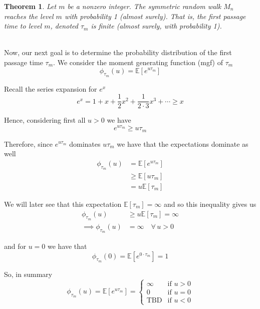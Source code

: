\documentclass[12pt]{article}
\newtheorem{theorem}{Theorem}
\newlength\tindent
\renewcommand{\indent}{\hspace*{\tindent}}
\newcommand{\E}{\mathbb E}
\begin{document}
\begin{theorem} Let $m$ be a nonzero integer. The symmetric random walk $M_n$ reaches the level $m$ with probability 1 (almost surely). That is, the first passage time to level $m$, denoted $\tau_m$ is finite (almost surely, with probability 1).
\end{theorem} \hfill\\%

\indent Now, our next goal is to determine the probability distribution of the first passage time $\tau_m$. We consider the moment generating function (mgf) of $\tau_m$
\begin{equation*}
	\phi_{\tau_m}(u) = \E[e^{u\tau_m}] 
\end{equation*}

Recall the series expansion for $e^x$
\begin{equation*}
	e^x = 1 + x + \frac{1}{2}x^2 + \frac{1}{2\cdot 3} x^3 + \cdots \geq x
\end{equation*}

Hence, considering first all $u > 0$ we have
\begin{equation*}
	e^{u\tau_m} \geq u \tau_m
\end{equation*}

Therefore, since $e^{u\tau_m}$ dominates $u\tau_m$ we have that the expectations dominate as well
\begin{align*}
	\phi_{\tau_m}(u) &= \E[e^{u\tau_m}] \\
	&\geq \E [u\tau_m] \\
	&= u\E[\tau_m]
\end{align*}

We will later see that this expectation $\E[\tau_m] = \infty$ and so this inequality gives us
\begin{align*}
	\phi_{\tau_m}(u) &\geq u\E[\tau_m] = \infty \\
	\implies \phi_{\tau_m}(u) &= \infty \quad \forall\,u > 0
\end{align*}

and for $u = 0$ we have that
\begin{equation*}
	\phi_{\tau_m}(0) = \E [e^{0\cdot \tau_m}] = 1
\end{equation*}

So, in summary
\begin{equation*}
	\phi_{\tau_m}(u) = \E[e^{u\tau_m}] =
	\begin{cases}
		\infty & \text{if } u > 0 \\
		0 & \text{if } u = 0 \\
		\text{TBD} & \text{if } u < 0
	\end{cases}
\end{equation*}
\end{document}
